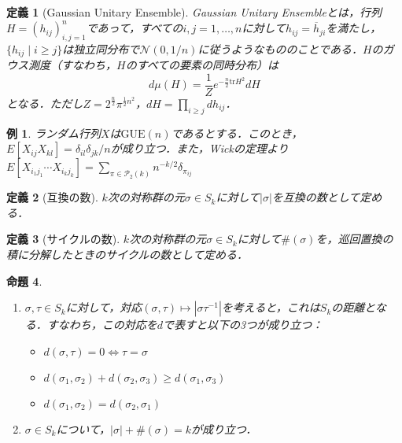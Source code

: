 \documentclass{ltjsarticle}
\theoremstyle{mystyle1}
\newtheorem{dfn}{定義}[section]
\newtheorem{prop}[dfn]{命題}
\theoremstyle{mystyle2}
\newtheorem{example}{例}
\theoremstyle{mystyle3}
\begin{document}
\begin{dfn}[Gaussian Unitary Ensemble]
    Gaussian Unitary Ensembleとは，行列$H=(h_{ij})_{i,j=1}^n$であって，すべての$i,j=1,\ldots,n$に対して$h_{ij}=\overline{h}_{ji}$を満たし，$\{h_{ij}\mid i\geq j\}$は独立同分布で$\mathcal{N}(0,1/n)$に従うようなもののことである．$H$のガウス測度（すなわち，$H$のすべての要素の同時分布）は
    \begin{equation}
        d\mu(H)=\frac{1}{Z}e^{-\frac{n}{2}\mathrm{tr}H^2}dH
    \end{equation}
    となる．ただし$Z=2^{\frac{n}{2}}\pi^{\frac{1}{2}n^2}$，$dH=\prod_{i\geq j}dh_{ij}$．
\end{dfn}

\begin{example}
    ランダム行列$X$は$\mathrm{GUE}(n)$であるとする．このとき，$E[X_{ij}X_{kl}]=\delta_{il}\delta_{jk}/n$が成り立つ．また，Wickの定理より$E[X_{i_1j_1}\cdots X_{i_kj_k}]=\sum_{\pi\in\mathcal{P}_2(k)}n^{-k/2}\delta_{\pi_{ij}}$
\end{example}

\begin{dfn}[互換の数]
    $k$次の対称群の元$\sigma\in S_k$に対して$|\sigma|$を互換の数として定める．
\end{dfn}

\begin{dfn}[サイクルの数]
    $k$次の対称群の元$\sigma\in S_k$に対して$\#(\sigma)$を，巡回置換の積に分解したときのサイクルの数として定める．
\end{dfn}

\begin{prop}
    \
    \begin{enumerate}
        \item $\sigma,\tau \in S_k$に対して，対応$(\sigma,\tau)\mapsto |\sigma\tau^{-1}|$を考えると，これは$S_k$の距離となる．すなわち，この対応を$d$で表すと以下の3つが成り立つ：
              \begin{itemize}
                  \item $d(\sigma,\tau)=0\Leftrightarrow \tau=\sigma$
                  \item $d(\sigma_1,\sigma_2)+d(\sigma_2,\sigma_3)\geq d(\sigma_1,\sigma_3)$
                  \item $d(\sigma_1,\sigma_2)=d(\sigma_2,\sigma_1)$
              \end{itemize}
        \item $\sigma\in S_k$について，$|\sigma|+\#(\sigma)=k$が成り立つ．
    \end{enumerate}
\end{prop}
\end{document}
